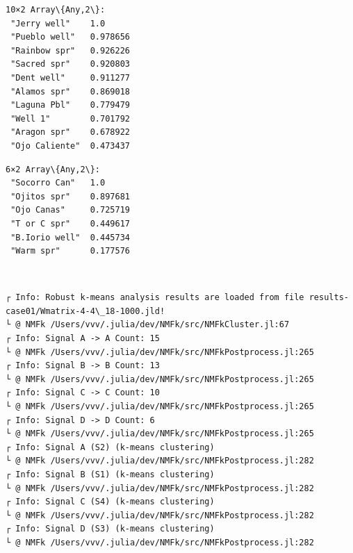 \documentclass[11pt]{article}
\begin{document}
    \begin{Verbatim}[commandchars=\\\{\}]
10×2 Array\{Any,2\}:
 "Jerry well"    1.0
 "Pueblo well"   0.978656
 "Rainbow spr"   0.926226
 "Sacred spr"    0.920803
 "Dent well"     0.911277
 "Alamos spr"    0.869018
 "Laguna Pbl"    0.779479
 "Well 1"        0.701792
 "Aragon spr"    0.678922
 "Ojo Caliente"  0.473437
    \end{Verbatim}



    \begin{Verbatim}[commandchars=\\\{\}]
6×2 Array\{Any,2\}:
 "Socorro Can"   1.0
 "Ojitos spr"    0.897681
 "Ojo Canas"     0.725719
 "T or C spr"    0.449617
 "B.Iorio well"  0.445734
 "Warm spr"      0.177576
    \end{Verbatim}


    \begin{center}
    \end{center}
    { \hspace*{\fill} \\}

    \begin{Verbatim}[commandchars=\\\{\}]
┌ Info: Robust k-means analysis results are loaded from file results-
case01/Wmatrix-4-4\_18-1000.jld!
└ @ NMFk /Users/vvv/.julia/dev/NMFk/src/NMFkCluster.jl:67
┌ Info: Signal A -> A Count: 15
└ @ NMFk /Users/vvv/.julia/dev/NMFk/src/NMFkPostprocess.jl:265
┌ Info: Signal B -> B Count: 13
└ @ NMFk /Users/vvv/.julia/dev/NMFk/src/NMFkPostprocess.jl:265
┌ Info: Signal C -> C Count: 10
└ @ NMFk /Users/vvv/.julia/dev/NMFk/src/NMFkPostprocess.jl:265
┌ Info: Signal D -> D Count: 6
└ @ NMFk /Users/vvv/.julia/dev/NMFk/src/NMFkPostprocess.jl:265
┌ Info: Signal A (S2) (k-means clustering)
└ @ NMFk /Users/vvv/.julia/dev/NMFk/src/NMFkPostprocess.jl:282
┌ Info: Signal B (S1) (k-means clustering)
└ @ NMFk /Users/vvv/.julia/dev/NMFk/src/NMFkPostprocess.jl:282
┌ Info: Signal C (S4) (k-means clustering)
└ @ NMFk /Users/vvv/.julia/dev/NMFk/src/NMFkPostprocess.jl:282
┌ Info: Signal D (S3) (k-means clustering)
└ @ NMFk /Users/vvv/.julia/dev/NMFk/src/NMFkPostprocess.jl:282
    \end{Verbatim}

    \begin{center}
    \end{center}
    { \hspace*{\fill} \\}
\end{document}
